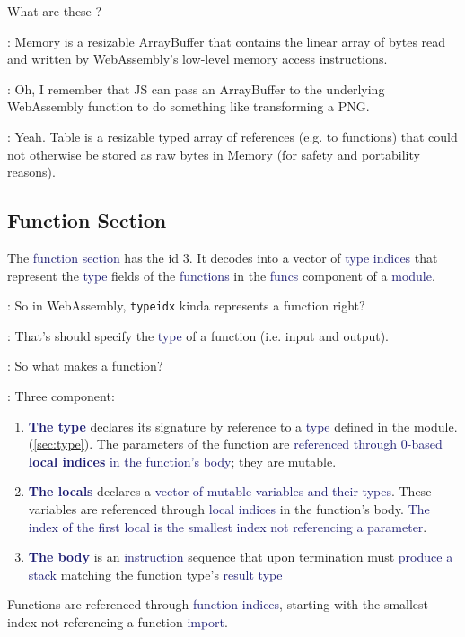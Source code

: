 \documentclass[dvipsnames]{article}
\newcommand{\mycola}{MidnightBlue}
\newcommand{\cola}[1]{\textcolor{\mycola}{#1}}
\newcommand{\Cola}[1]{\textcolor{\mycola}{\textbf{#1}}}
\begin{document}
 What are these ?

 : Memory is a resizable ArrayBuffer that contains the linear
array of bytes read and written by WebAssembly's low-level memory access
instructions.

 : Oh, I remember that JS can pass an ArrayBuffer to the
underlying WebAssembly function to do something like transforming a PNG.

 : Yeah. Table is a resizable typed array of references (e.g. to
functions) that could not otherwise be stored as raw bytes in Memory (for safety
and portability reasons).

\subsection{Function Section}

The \cola{function section} has the id 3. It decodes into a vector of \cola{type
indices} that represent the \cola{type} fields of the \cola{functions} in the
\cola{funcs} component of a \cola{module}.

 : So in WebAssembly, \texttt{typeidx} kinda represents a function
right?

 : That's should specify the \cola{type} of a function (i.e. input
and output).

 : So what makes a function?

 : Three component:

\begin{enumerate}
\item \Cola{The type} declares its signature by reference to a \cola{type}
  defined in the module. (\cref{sec:type}). The parameters of the function are
  \cola{referenced through 0-based \textbf{local indices} in the function's
    body}; they are mutable.
\item \Cola{The locals} declares a \cola{vector of mutable variables and their
    types}. These variables are referenced through \cola{local indices} in the
  function's body. \cola{The index of the first local is the smallest index not
    referencing a parameter}.
\item \Cola{The body} is an \cola{instruction} sequence that upon termination
  must \cola{produce a stack} matching the function type's \cola{result type}
\end{enumerate}

Functions are referenced through \cola{function indices}, starting with the
smallest index not referencing a function \cola{import}.
\end{document}

